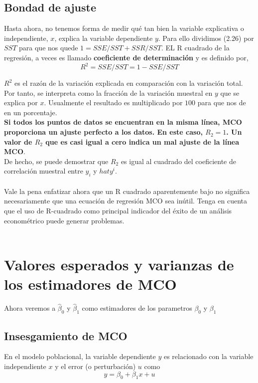 \subsection{Bondad de ajuste}
Hasta ahora, no tenemos forma de medir qué tan bien la variable explicativa o independiente, $x$, explica la variable dependiente $y$. Para ello dividimos (2.26) por $SST$ para que nos quede $1=SSE/SST + SSR/SST$. EL R cuadrado de la regresión, a veces es llamado \textbf{coeficiente de determinación} y es definido por,
\begin{equation}
	R^2 = SSE/SST = 1 - SSE/SST
\end{equation}

$R^2$ es el razón de la variación explicada en comparación con la variación total. Por tanto, se interpreta como la fracción de la variación muestral en $y$ que se explica por $x$. Usualmente el resultado es multiplicado por $100$ para que nos de en un porcentaje.\\
\textbf{Si todos los puntos de datos se encuentran en la misma línea, MCO proporciona un ajuste perfecto a los datos. En este caso, $R_2 = 1$. Un valor de $R_2$ que es casi igual a cero indica un mal ajuste de la línea MCO}.\\
De hecho, se puede demostrar que $R_2$ es igual al cuadrado del coeficiente de correlación muestral entre $y_i$ y $hat{y}^i$.\\\\
Vale la pena enfatizar ahora que un R cuadrado aparentemente bajo no significa necesariamente que una ecuación de regresión MCO sea inútil. Tenga en cuenta que el uso de R-cuadrado como principal indicador del éxito de un análisis econométrico puede generar problemas.\\\\

\setcounter{section}{4}
\section{Valores esperados y varianzas de los estimadores de MCO}
Ahora veremos a $\hat{\beta}_0$ y $\hat{\beta}_1$ como estimadores de los parametros $\beta_0$ y $\beta_1$

\subsection{Insesgamiento de MCO}

\begin{tcolorbox}[title={Supuesto 1 SLR.1. Liniealidad en los parametros},colback = white]
    En el modelo poblacional, la variable dependiente $y$ es relacionado con la variable independiente $x$ y el error (o perturbación) $u$ como 
    \begin{equation}
	y = \beta_0 + \beta_1 x + u
    \end{equation}
\end{tcolorbox}

